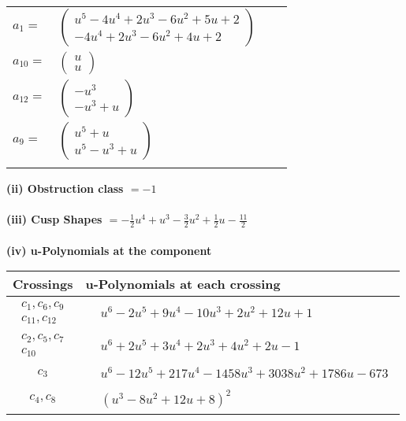 \documentclass[1p]{elsarticle_modified}
\theoremstyle{definition}
\begin{document}
\begin{tabular}{m{7pt} m{180pt} m{7pt} m{180pt} }
\flushright $a_{1}=$&$\begin{pmatrix}u^5-4 u^4+2 u^3-6 u^2+5 u+2\\-4 u^4+2 u^3-6 u^2+4 u+2\end{pmatrix}$ \\
\flushright $a_{10}=$&$\begin{pmatrix}u\\u\end{pmatrix}$ \\
\flushright $a_{12}=$&$\begin{pmatrix}- u^3\\- u^3+u\end{pmatrix}$ \\
\flushright $a_{9}=$&$\begin{pmatrix}u^5+u\\u^5- u^3+u\end{pmatrix}$\\&\end{tabular}
\flushleft \textbf{(ii) Obstruction class $= -1$}\\~\\
\flushleft \textbf{(iii) Cusp Shapes $= -\frac{1}{2} u^4+u^3-\frac{3}{2} u^2+\frac{1}{2} u-\frac{11}{2}$}\\~\\
\newpage\renewcommand{\arraystretch}{1}
\flushleft \textbf{(iv) u-Polynomials at the component}\newline \\
\begin{tabular}{m{50pt}|m{274pt}}
Crossings & \hspace{64pt}u-Polynomials at each crossing \\
\hline $$\begin{aligned}c_{1},c_{6},c_{9}\\c_{11},c_{12}\end{aligned}$$&$\begin{aligned}
&u^6-2 u^5+9 u^4-10 u^3+2 u^2+12 u+1
\end{aligned}$\\
\hline $$\begin{aligned}c_{2},c_{5},c_{7}\\c_{10}\end{aligned}$$&$\begin{aligned}
&u^6+2 u^5+3 u^4+2 u^3+4 u^2+2 u-1
\end{aligned}$\\
\hline $$\begin{aligned}c_{3}\end{aligned}$$&$\begin{aligned}
&u^6-12 u^5+217 u^4-1458 u^3+3038 u^2+1786 u-673
\end{aligned}$\\
\hline $$\begin{aligned}c_{4},c_{8}\end{aligned}$$&$\begin{aligned}
&(u^3-8 u^2+12 u+8)^2
\end{aligned}$\\
\hline
\end{tabular}\\~\\
\end{document}
